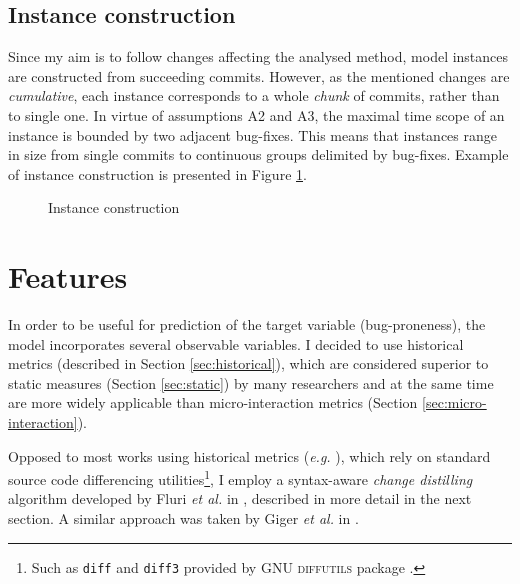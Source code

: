 \documentclass{pracamgr}
\begin{document}
\subsection{Instance construction}
\label{sec:instance_construction}

Since my aim is to follow changes affecting the analysed method, model instances are constructed from succeeding commits. However, as the mentioned changes are \emph{cumulative}, each instance corresponds to a whole \emph{chunk} of commits, rather than to single one. In virtue of assumptions A2 and A3, the maximal time scope of an instance is bounded by two adjacent bug-fixes. This means that instances range in size from single commits to continuous groups delimited by bug-fixes. Example of instance construction is presented in Figure \ref{fig:instance_construction}.

\begin{figure}[h]
\centering

\caption{Instance construction}
\label{fig:instance_construction}
\end{figure}

\section{Features}
\label{sec:features}
In order to be useful for prediction of the target variable (bug-proneness), the model incorporates several observable variables. I decided to use historical metrics (described in Section \ref{sec:historical}), which are considered superior to static measures (Section \ref{sec:static}) by many researchers \cite{merits, comparative, how_and_why} and at the same time are more widely applicable than micro-interaction metrics (Section \ref{sec:micro-interaction}).

Opposed to most works using historical metrics (\textit{e.g.} \cite{systematic, merits, micro_interaction, comparative, how_and_why}), which rely on standard source code differencing utilities\footnote{Such as \texttt{diff} and \texttt{diff3} provided by \textsc{GNU diffutils} package \cite{diffutils}.}, I employ a syntax-aware \emph{change distilling} algorithm developed by Fluri \textit{et al.} in \cite{change_distilling}, described in more detail in the next section. A similar approach was taken by Giger \textit{et al.} in \cite{method-level}.
\end{document}
